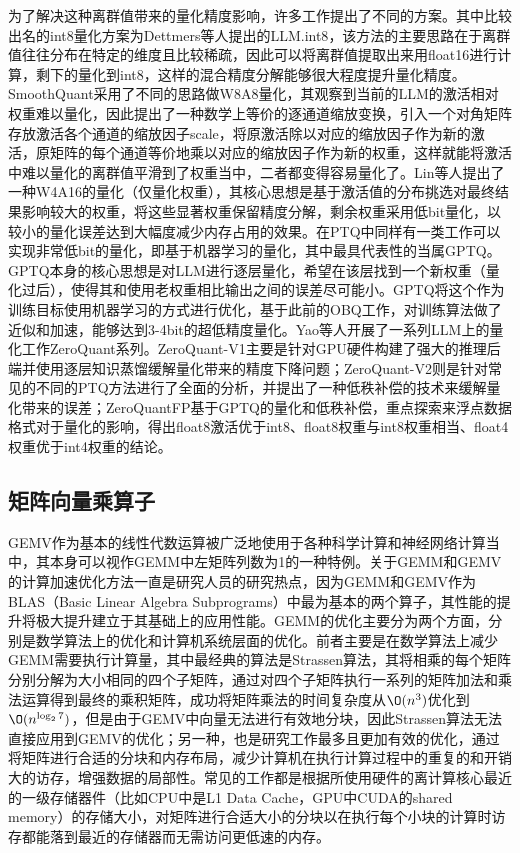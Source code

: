 为了解决这种离群值带来的量化精度影响，许多工作提出了不同的方案。其中比较出名的int8量化方案为Dettmers等人提出的LLM.int8\cite{LLMINT8}，该方法的主要思路在于离群值往往分布在特定的维度且比较稀疏，因此可以将离群值提取出来用float16进行计算，剩下的量化到int8，这样的混合精度分解能够很大程度提升量化精度。SmoothQuant采用了不同的思路\cite{SmoothQuant}做W8A8量化，其观察到当前的LLM的激活相对权重难以量化，因此提出了一种数学上等价的逐通道缩放变换，引入一个对角矩阵存放激活各个通道的缩放因子scale，将原激活除以对应的缩放因子作为新的激活，原矩阵的每个通道等价地乘以对应的缩放因子作为新的权重，这样就能将激活中难以量化的离群值平滑到了权重当中，二者都变得容易量化了。Lin等人提出了一种W4A16的量化（仅量化权重）\cite{AWQ}，其核心思想是基于激活值的分布挑选对最终结果影响较大的权重，将这些显著权重保留精度分解，剩余权重采用低bit量化，以较小的量化误差达到大幅度减少内存占用的效果。在PTQ中同样有一类工作可以实现非常低bit的量化，即基于机器学习的量化，其中最具代表性的当属GPTQ。GPTQ\cite{GPTQ}本身的核心思想是对LLM进行逐层量化，希望在该层找到一个新权重（量化过后），使得其和使用老权重相比输出之间的误差尽可能小。GPTQ将这个作为训练目标使用机器学习的方式进行优化，基于此前的OBQ工作\cite{OBQ}，对训练算法做了近似和加速，能够达到3-4bit的超低精度量化。Yao等人开展了一系列LLM上的量化工作ZeroQuant系列\cite{ZeroQuant1,ZeroQuant2,ZeroQuantFP}。ZeroQuant-V1主要是针对GPU硬件构建了强大的推理后端并使用逐层知识蒸馏缓解量化带来的精度下降问题\cite{ZeroQuant1}；ZeroQuant-V2则是针对常见的不同的PTQ方法进行了全面的分析，并提出了一种低秩补偿的技术来缓解量化带来的误差\cite{ZeroQuant2}；ZeroQuantFP基于GPTQ的量化和低秩补偿，重点探索来浮点数据格式对于量化的影响，得出float8激活优于int8、float8权重与int8权重相当、float4权重优于int4权重的结论\cite{ZeroQuantFP}。

\subsection{矩阵向量乘算子}
GEMV作为基本的线性代数运算被广泛地使用于各种科学计算和神经网络计算当中，其本身可以视作GEMM中左矩阵列数为1的一种特例。关于GEMM和GEMV的计算加速优化方法一直是研究人员的研究热点，因为GEMM和GEMV作为BLAS（Basic Linear Algebra Subprograms）中最为基本的两个算子，其性能的提升将极大提升建立于其基础上的应用性能。GEMM的优化主要分为两个方面，分别是数学算法上的优化和计算机系统层面的优化。前者主要是在数学算法上减少GEMM需要执行计算量，其中最经典的算法是Strassen算法\cite{Strassen}，其将相乘的每个矩阵分别分解为大小相同的四个子矩阵，通过对四个子矩阵执行一系列的矩阵加法和乘法运算得到最终的乘积矩阵，成功将矩阵乘法的时间复杂度从$\O(n^3)$优化到$\O(n^{\log_{2}7})$，但是由于GEMV中向量无法进行有效地分块，因此Strassen算法无法直接应用到GEMV的优化；另一种，也是研究工作最多且更加有效的优化，通过将矩阵进行合适的分块和内存布局，减少计算机在执行计算过程中的重复的和开销大的访存，增强数据的局部性。常见的工作都是根据所使用硬件的离计算核心最近的一级存储器件（比如CPU中是L1 Data Cache，GPU中CUDA的shared memory\cite{Cuda}）的存储大小，对矩阵进行合适大小的分块以在执行每个小块的计算时访存都能落到最近的存储器而无需访问更低速的内存。

